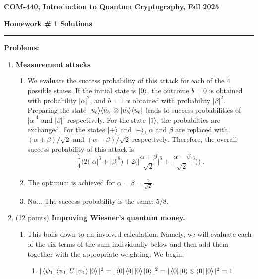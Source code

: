 \documentclass[12pt]{article}
\newcommand{\header}[1]{\begin{center} {\large\bf #1} \end{center}}
\begin{document}
\header{COM-440, Introduction to Quantum Cryptography, Fall 2025}
{\bf Homework \# 1 Solutions} 


\medskip

\hrule

 
\medskip
{\bf Problems:}

\begin{enumerate}
		


\item {\bf Measurement attacks}

\begin{enumerate}
\item We evaluate the success probability of this attack for each of the $4$ possible states. If the initial state is $\ket{0}$, the outcome $b=0$ is obtained with probability $|\alpha|^2$, and $b=1$ is obtained with probability $|\beta|^2$. Preparing the state $\ket{u_b}\!\bra{u_b} \otimes \ket{u_b}\!\bra{u_b}$ leads to success probabilities of $|\alpha|^4$ and $|\beta|^4$ respectively. For the state $\ket{1}$, the probabilties are exchanged. For the states $\ket{+}$ and $\ket{-}$, $\alpha$ and $\beta$ are replaced with $(\alpha + \beta)/\sqrt{2}$ and $(\alpha-\beta)/\sqrt{2}$ respectively. Therefore, the overall success probability of this attack is 
\[ \frac{1}{4}\Big( 2 \big( |\alpha|^6 + |\beta|^6\big) + 2\Big( \Big| \frac{\alpha + \beta}{\sqrt{2}}\Big|^6
+\Big| \frac{\alpha - \beta}{\sqrt{2}}\Big|^6\Big)\Big)\;.\]
\item The optimum is achieved for $\alpha=\beta=\frac{1}{\sqrt{2}}$. 
\item No... The success probability is the same: $5/8$. 
\end{enumerate}



\item (12 points) {\bf Improving Wiesner's quantum money.}

\begin{enumerate}
\item 
This boils down to an involved calculation. Namely, we will evaluate each of the six terms of the sum individually below and then add them together with the appropriate weighting. We begin;
\begin{enumerate}
    \item $|\bra{\psi_1}\bra{\psi_1}U\ket{\psi_1} \ket{0}|^2 = |\bra{0}\bra{0}\ket{0}\ket{0}|^2 = |\bra{0}\ket{0}\otimes \bra{0}\ket{0}|^2 = 1 $
    

\end{enumerate}
\end{enumerate}
\end{enumerate}
\end{document}
